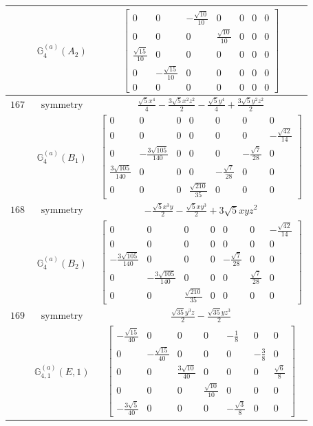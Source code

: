 \documentclass[fleqn,8pt,landscape]{jsarticle}
\begin{document}
\begin{longtable}{ccc}
$  $ & $ \mathbb{G}_{4}^{(a)}(A_{2}) $ & $ \begin{bmatrix} 0 & 0 & - \frac{\sqrt{10}}{10} & 0 & 0 & 0 & 0 \\ 0 & 0 & 0 & \frac{\sqrt{10}}{10} & 0 & 0 & 0 \\ \frac{\sqrt{15}}{10} & 0 & 0 & 0 & 0 & 0 & 0 \\ 0 & - \frac{\sqrt{15}}{10} & 0 & 0 & 0 & 0 & 0 \\ 0 & 0 & 0 & 0 & 0 & 0 & 0 \end{bmatrix} $ \\ \hline
$ 167 $ & $ \text{symmetry} $ & $ \frac{\sqrt{5} x^{4}}{4} - \frac{3 \sqrt{5} x^{2} z^{2}}{2} - \frac{\sqrt{5} y^{4}}{4} + \frac{3 \sqrt{5} y^{2} z^{2}}{2} $ \\
$  $ & $ \mathbb{G}_{4}^{(a)}(B_{1}) $ & $ \begin{bmatrix} 0 & 0 & 0 & 0 & 0 & 0 & 0 \\ 0 & 0 & 0 & 0 & 0 & 0 & - \frac{\sqrt{42}}{14} \\ 0 & - \frac{3 \sqrt{105}}{140} & 0 & 0 & 0 & - \frac{\sqrt{7}}{28} & 0 \\ \frac{3 \sqrt{105}}{140} & 0 & 0 & 0 & - \frac{\sqrt{7}}{28} & 0 & 0 \\ 0 & 0 & 0 & \frac{\sqrt{210}}{35} & 0 & 0 & 0 \end{bmatrix} $ \\ \hline
$ 168 $ & $ \text{symmetry} $ & $ - \frac{\sqrt{5} x^{3} y}{2} - \frac{\sqrt{5} x y^{3}}{2} + 3 \sqrt{5} x y z^{2} $ \\
$  $ & $ \mathbb{G}_{4}^{(a)}(B_{2}) $ & $ \begin{bmatrix} 0 & 0 & 0 & 0 & 0 & 0 & - \frac{\sqrt{42}}{14} \\ 0 & 0 & 0 & 0 & 0 & 0 & 0 \\ - \frac{3 \sqrt{105}}{140} & 0 & 0 & 0 & - \frac{\sqrt{7}}{28} & 0 & 0 \\ 0 & - \frac{3 \sqrt{105}}{140} & 0 & 0 & 0 & \frac{\sqrt{7}}{28} & 0 \\ 0 & 0 & \frac{\sqrt{210}}{35} & 0 & 0 & 0 & 0 \end{bmatrix} $ \\ \hline
$ 169 $ & $ \text{symmetry} $ & $ \frac{\sqrt{35} y^{3} z}{2} - \frac{\sqrt{35} y z^{3}}{2} $ \\
$  $ & $ \mathbb{G}_{4,1}^{(a)}(E,1) $ & $ \begin{bmatrix} - \frac{\sqrt{15}}{40} & 0 & 0 & 0 & - \frac{1}{8} & 0 & 0 \\ 0 & - \frac{\sqrt{15}}{40} & 0 & 0 & 0 & - \frac{3}{8} & 0 \\ 0 & 0 & \frac{3 \sqrt{10}}{40} & 0 & 0 & 0 & \frac{\sqrt{6}}{8} \\ 0 & 0 & 0 & \frac{\sqrt{10}}{10} & 0 & 0 & 0 \\ - \frac{3 \sqrt{5}}{40} & 0 & 0 & 0 & - \frac{\sqrt{3}}{8} & 0 & 0 \end{bmatrix} $ \\ \hline

\end{longtable}
\end{document}
